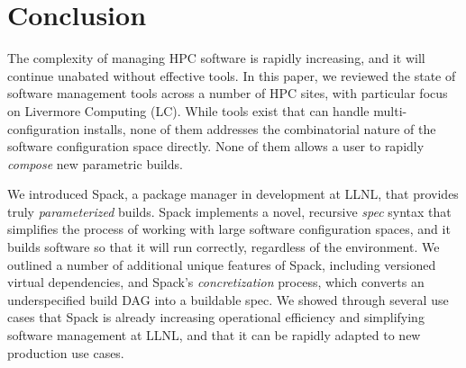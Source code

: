 
\section{Conclusion}
\label{sec:conclusion}


The complexity of managing HPC software is rapidly increasing, and it
will continue unabated without effective tools.
In this paper, we reviewed the state of software management tools 
across a number of HPC sites, with particular focus on Livermore
Computing (LC). While tools exist that can handle multi-configuration
installs, none of them addresses the combinatorial nature
of the software configuration space directly. None of them allows
a user to rapidly {\it compose} new parametric builds.

We introduced Spack, a package manager in development at LLNL, that
provides truly {\it parameterized} builds.  Spack implements
a novel, recursive {\it spec} syntax that simplifies the process of working
with large software configuration spaces, and it builds software 
so that it will run correctly, regardless of the environment.
We outlined a number of additional unique features of Spack, including
versioned virtual dependencies, and Spack's {\it concretization} process,
which converts an underspecified build DAG into a buildable spec.
We showed through several use cases that Spack is already
increasing operational efficiency and simplifying software management
at LLNL, and that it can be rapidly adapted to new production use cases.



